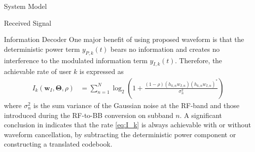 \documentclass{IEEEtran}
\begin{document}
\begin{section} {System Model}
\begin{subsection}	{Received Signal}
	\end{subsection}

	\begin{subsection}	{Information Decoder}
		One major benefit of using proposed waveform is that the deterministic power term $y_{P,k}(t)$ bears no information and creates no interference to the modulated information term $y_{I,k}(t)$. Therefore, the achievable rate of user $k$ is expressed as
		\begin{equation}	\label{eq:I_k}
			\begin{split}
				I_k(\boldsymbol{w}_I,\boldsymbol{\Theta},\rho)
				&=\sum_{n=1}^N{\log_2\left(1+\frac{(1-\rho)(h_{k,n}w_{I,n})(h_{k,n}w_{I,n})^*}{\sigma_n^2}\right)}
			\end{split}
		\end{equation}
		where $\sigma_n^2$ is the sum variance of the Gaussian noise at the RF-band and those introduced during the RF-to-BB conversion on subband $n$. A significant conclusion in \cite{Clerckx2018b} indicates that the rate \ref{eq:I_k} is always achievable with or without waveform cancellation, by subtracting the deterministic power component or constructing a translated codebook.
	\end{subsection}


\end{section}
\end{document}
